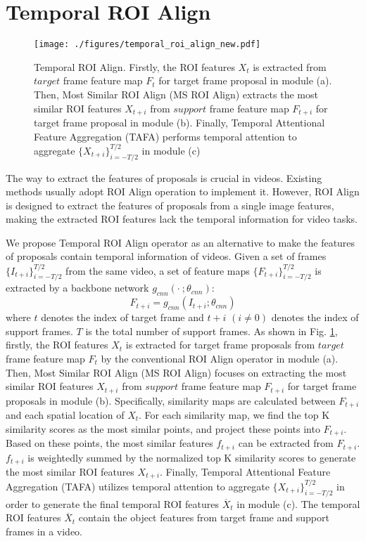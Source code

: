 \documentclass[letterpaper]{article} \usepackage{aaai21}  \usepackage{times}  \usepackage{helvet} \usepackage{courier}  \usepackage[hyphens]{url}  \usepackage{graphicx} \usepackage{hyperref}
\begin{document}
\section{Temporal ROI Align}

\begin{figure}[t]
\centering
\texttt{[image: ./figures/temporal\_roi\_align\_new.pdf]}
\vspace{-0.6cm}
\caption{Temporal ROI Align. Firstly, the ROI features $X_t$ is extracted from $target$ frame feature map $F_t$ for target frame proposal in module (a). Then, Most Similar ROI Align (MS ROI Align) extracts the most similar ROI features $X_{t+i}$ from $support$ frame feature map $F_{t+i}$ for target frame proposal in module (b). Finally, Temporal Attentional Feature Aggregation (TAFA) performs temporal attention to aggregate $\{X_{t+i}\}_{i=-T/2}^{T/2}$ in module (c)
}
\label{fig:method}
\vspace{-0.25cm}
\end{figure}

The way to extract the features of proposals is crucial in videos. Existing methods usually adopt ROI Align operation to implement it. However, ROI Align is designed to extract the features of proposals from a single image features, making the extracted ROI features lack the temporal information for video tasks.

We propose Temporal ROI Align operator as an alternative to make the features of proposals contain temporal information of videos. Given a set of frames $\{I_{t+i}\}_{i=-T/2}^{T/2}$ from the same video, a set of feature maps $\{F_{t+i}\}_{i=-T/2}^{T/2}$ is extracted by a backbone network $g_{cnn}(\cdot\ ;\theta_{cnn})$:
\begin{equation}
F_{t+i} = g_{cnn}(I_{t+i}; \theta_{cnn})
\end{equation}
where $t$ denotes the index of target frame and $t+i$ $(i\neq0)$ denotes the index of support frames. $T$ is the total number of support frames. As shown in Fig. \ref{fig:method}, firstly, the ROI features $X_t$ is extracted for target frame proposals from $target$ frame feature map $F_t$ by the conventional ROI Align operator in module (a). Then, Most Similar ROI Align (MS ROI Align) focuses on extracting the most similar ROI features $X_{t+i}$ from $support$ frame feature map $F_{t+i}$ for target frame proposals in module (b). Specifically, similarity maps are calculated between $F_{t+i}$ and each spatial location of $X_t$. For each similarity map, we find the top K similarity scores as the most similar points, and project these points into $F_{t+i}$. Based on these points, the most similar features $f_{t+i}$  can be extracted from $F_{t+i}$. $f_{t+i}$ is weightedly summed by the normalized top K similarity scores to generate the most similar ROI features $X_{t+i}$. Finally, Temporal Attentional Feature Aggregation (TAFA) utilizes temporal attention to aggregate $\{X_{t+i}\}_{i=-T/2}^{T/2}$ in order to generate the final temporal ROI features $\overline{X}_t$ in module (c). The temporal ROI features $\overline{X}_t$ contain the object features from target frame and support frames in a video.
\end{document}
